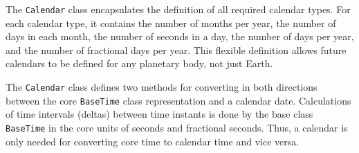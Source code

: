 
The {\tt Calendar} class encapsulates the definition of all required
calendar types. For each calendar type, it contains the number of months
per year, the number of days in each month, the number of seconds in a day,
the number of days per year, and the number of fractional days per year.
This flexible definition allows future calendars to be defined for any
planetary body, not just Earth.

The {\tt Calendar} class defines two methods for converting in both
directions between the core {\tt BaseTime} class representation and a
calendar date.  Calculations of time intervals (deltas) between
time instants is done by the base class {\tt BaseTime} in the core units
of seconds and fractional seconds.  Thus,  a calendar is only needed for
converting core time to calendar time and vice versa.

